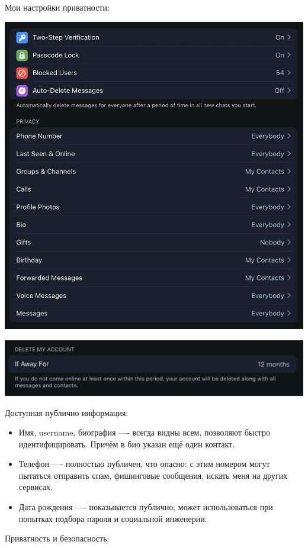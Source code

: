 \documentclass{article}
\begin{document}
Мои настройки приватности:

\begin{center}
    \includegraphics[width=.9\textwidth]{13}
\end{center}
\begin{center}
    \includegraphics[width=.9\textwidth]{14}
\end{center}

Доступная публично информация:

\begin{itemize}
    \item Имя, username, биография —- всегда видны всем, позволяют быстро идентифицировать. Причём в био указан ещё один контакт.
    \item Телефон —- полностью публичен, что опасно: с этим номером могут пытаться отправить спам, фишинговые сообщения, искать меня на других сервисах.
    \item Дата рождения —- показывается публично, может использоваться при попытках подбора пароля и социальной инженерии.
\end{itemize}

Приватность и безопасность:
\end{document}
